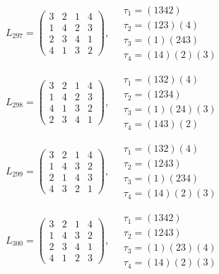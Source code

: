 $L_{297} = \begin{pmatrix} 3 & 2 & 1 & 4 \\ 1 & 4 & 2 & 3 \\ 2 & 3 & 4 & 1 \\ 4 & 1 & 3 & 2 \end{pmatrix}, \quad \begin{matrix} \tau_{1} = (1 3 4 2) \\ \tau_{2} = (1 2 3)(4) \\ \tau_{3} = (1)(2 4 3) \\ \tau_{4} = (1 4)(2)(3) \end{matrix}$

$L_{298} = \begin{pmatrix} 3 & 2 & 1 & 4 \\ 1 & 4 & 2 & 3 \\ 4 & 1 & 3 & 2 \\ 2 & 3 & 4 & 1 \end{pmatrix}, \quad \begin{matrix} \tau_{1} = (1 3 2)(4) \\ \tau_{2} = (1 2 3 4) \\ \tau_{3} = (1)(2 4)(3) \\ \tau_{4} = (1 4 3)(2) \end{matrix}$

$L_{299} = \begin{pmatrix} 3 & 2 & 1 & 4 \\ 1 & 4 & 3 & 2 \\ 2 & 1 & 4 & 3 \\ 4 & 3 & 2 & 1 \end{pmatrix}, \quad \begin{matrix} \tau_{1} = (1 3 2)(4) \\ \tau_{2} = (1 2 4 3) \\ \tau_{3} = (1)(2 3 4) \\ \tau_{4} = (1 4)(2)(3) \end{matrix}$

$L_{300} = \begin{pmatrix} 3 & 2 & 1 & 4 \\ 1 & 4 & 3 & 2 \\ 2 & 3 & 4 & 1 \\ 4 & 1 & 2 & 3 \end{pmatrix}, \quad \begin{matrix} \tau_{1} = (1 3 4 2) \\ \tau_{2} = (1 2 4 3) \\ \tau_{3} = (1)(2 3)(4) \\ \tau_{4} = (1 4)(2)(3) \end{matrix}$

